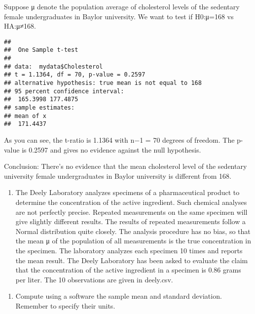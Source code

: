 \documentclass[]{article}
\newenvironment{Shaded}{\begin{snugshade}}{\end{snugshade}}
\newcommand{\KeywordTok}[1]{\textcolor[rgb]{0.13,0.29,0.53}{\textbf{#1}}}
\newcommand{\DataTypeTok}[1]{\textcolor[rgb]{0.13,0.29,0.53}{#1}}
\newcommand{\DecValTok}[1]{\textcolor[rgb]{0.00,0.00,0.81}{#1}}
\newcommand{\OperatorTok}[1]{\textcolor[rgb]{0.81,0.36,0.00}{\textbf{#1}}}
\newcommand{\NormalTok}[1]{#1}
\providecommand{\tightlist}{%
  \setlength{\itemsep}{0pt}\setlength{\parskip}{0pt}}
\begin{document}
Suppose μ denote the population average of cholesterol levels of the
sedentary female undergraduates in Baylor university. We want to test if
H0:μ=168 vs HA:μ≠168.

\begin{Shaded}
\end{Shaded}

\begin{verbatim}
## 
##  One Sample t-test
## 
## data:  mydata$Cholesterol
## t = 1.1364, df = 70, p-value = 0.2597
## alternative hypothesis: true mean is not equal to 168
## 95 percent confidence interval:
##  165.3998 177.4875
## sample estimates:
## mean of x 
##  171.4437
\end{verbatim}

As you can see, the t-ratio is 1.1364 with n−1 = 70 degrees of freedom.
The p-value is 0.2597 and gives no evidence against the null hypothesis.

Conclusion: There's no evidence that the mean cholesterol level of the
sedentary university female undergraduates in Baylor university is
different from 168.

\begin{enumerate}
\def\labelenumi{\arabic{enumi}.}
\setcounter{enumi}{2}
\tightlist
\item
  The Deely Laboratory analyzes specimens of a pharmaceutical product to
  determine the concentration of the active ingredient. Such chemical
  analyses are not perfectly precise. Repeated measurements on the same
  specimen will give slightly different results. The results of repeated
  measurements follow a Normal distribution quite closely. The analysis
  procedure has no bias, so that the mean μ of the population of all
  measurements is the true concentration in the specimen. The laboratory
  analyzes each specimen 10 times and reports the mean result. The Deely
  Laboratory has been asked to evaluate the claim that the concentration
  of the active ingredient in a specimen is 0.86 grams per liter. The 10
  observations are given in deely.csv.
\end{enumerate}

\begin{enumerate}
\def\labelenumi{\alph{enumi})}
\tightlist
\item
  Compute using a software the sample mean and standard deviation.
  Remember to specify their units.
\end{enumerate}
\end{document}
